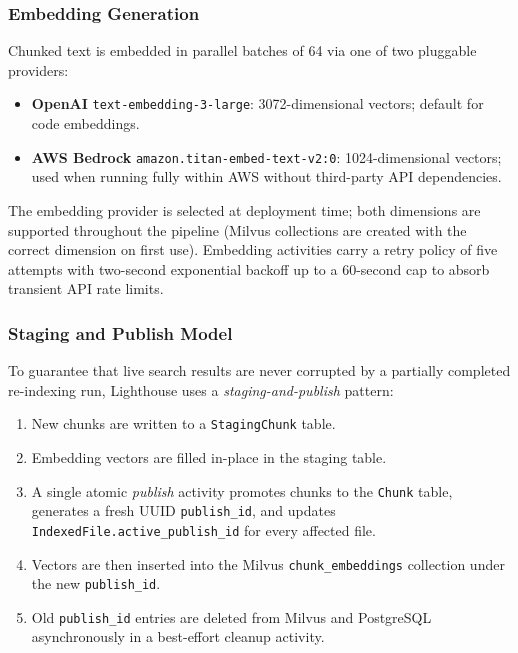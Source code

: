 \documentclass[a4paper,12pt]{article}
\begin{document}
\subsubsection{Embedding Generation}

Chunked text is embedded in parallel batches of 64 via one of two pluggable
providers:

\begin{itemize}[noitemsep]
  \item \textbf{OpenAI} \texttt{text-embedding-3-large}: 3072-dimensional
    vectors; default for code embeddings.
  \item \textbf{AWS Bedrock} \texttt{amazon.titan-embed-text-v2:0}: 1024-dimensional
    vectors; used when running fully within AWS without third-party API
    dependencies.
\end{itemize}

The embedding provider is selected at deployment time; both dimensions are
supported throughout the pipeline (Milvus collections are created with the
correct dimension on first use).
Embedding activities carry a retry policy of five attempts with two-second
exponential backoff up to a 60-second cap to absorb transient API rate limits.

\subsubsection{Staging and Publish Model}

To guarantee that live search results are never corrupted by a partially
completed re-indexing run, Lighthouse uses a \emph{staging-and-publish}
pattern:

\begin{enumerate}[noitemsep]
  \item New chunks are written to a \texttt{StagingChunk} table.
  \item Embedding vectors are filled in-place in the staging table.
  \item A single atomic \textit{publish} activity promotes chunks to the
    \texttt{Chunk} table, generates a fresh UUID \texttt{publish\_id}, and
    updates \texttt{IndexedFile.active\_publish\_id} for every affected file.
  \item Vectors are then inserted into the Milvus \texttt{chunk\_embeddings}
    collection under the new \texttt{publish\_id}.
  \item Old \texttt{publish\_id} entries are deleted from Milvus and
    PostgreSQL asynchronously in a best-effort cleanup activity.
\end{enumerate}
\end{document}
